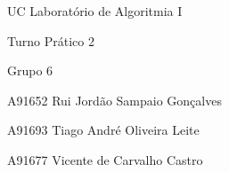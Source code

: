 UC Laboratório de Algoritmia I

Turno Prático 2

Grupo 6

A91652 Rui Jordão Sampaio Gonçalves ~\newline


A91693 Tiago André Oliveira Leite ~\newline


A91677 Vicente de Carvalho Castro ~\newline
 